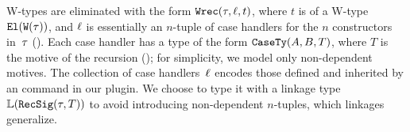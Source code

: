 %

W-types are eliminated with the form $\texttt{Wrec}({\tau},{\ell},{t})$, where $t$ is of a
W-type $\texttt{El}({\texttt{W}({\tau})})$, and $\ell$ is essentially an $n$-tuple of
case handlers for the $n$ constructors in~$\tau$ ().
Each case handler has a type of the form $\texttt{CaseTy}({A},{B},{T})$, where
$T$ is the motive of the recursion ();
for simplicity, we model only non-dependent motives.
The collection of case handlers~$\ell$ encodes those defined and inherited
by an  command in our plugin.
We choose to type it with a linkage type $\mathbb{L}({\texttt{RecSig}({\tau},{T})})$
to avoid introducing non-dependent $n$-tuples, which linkages generalize.



